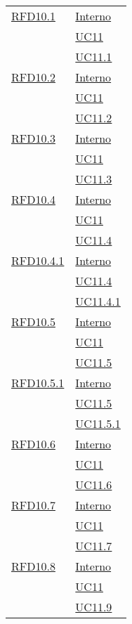 \begin{longtable}{|>{\centering}m{5cm}|m{5cm}<{\centering}|}
\hyperlink{RFD10.1}{RFD10.1} & \hyperlink{Interno}{Interno}\\
& \hyperref[UC11]{UC11}\\
& \hyperref[UC11.1]{UC11.1}\\ \hline

\hyperlink{RFD10.2}{RFD10.2} & \hyperlink{Interno}{Interno}\\
& \hyperref[UC11]{UC11}\\
& \hyperref[UC11.2]{UC11.2}\\ \hline

\hyperlink{RFD10.3}{RFD10.3} & \hyperlink{Interno}{Interno}\\
& \hyperref[UC11]{UC11}\\
& \hyperref[UC11.3]{UC11.3}\\ \hline

\hyperlink{RFD10.4}{RFD10.4} & \hyperlink{Interno}{Interno}\\
& \hyperref[UC11]{UC11}\\
& \hyperref[UC11.4]{UC11.4}\\ \hline

\hyperlink{RFD10.4.1}{RFD10.4.1} & \hyperlink{Interno}{Interno}\\
& \hyperref[UC11.4]{UC11.4}\\
& \hyperref[UC11.4.1]{UC11.4.1}\\ \hline

\hyperlink{RFD10.5}{RFD10.5} & \hyperlink{Interno}{Interno}\\
& \hyperref[UC11]{UC11}\\
& \hyperref[UC11.5]{UC11.5}\\ \hline

\hyperlink{RFD10.5.1}{RFD10.5.1} & \hyperlink{Interno}{Interno}\\
& \hyperref[UC11.5]{UC11.5}\\
& \hyperref[UC11.5.1]{UC11.5.1}\\ \hline

\hyperlink{RFD10.6}{RFD10.6} & \hyperlink{Interno}{Interno}\\
& \hyperref[UC11]{UC11}\\
& \hyperref[UC11.6]{UC11.6}\\ \hline

\hyperlink{RFD10.7}{RFD10.7} & \hyperlink{Interno}{Interno}\\
& \hyperref[UC11]{UC11}\\
& \hyperref[UC11.7]{UC11.7}\\ \hline

\hyperlink{RFD10.8}{RFD10.8} & \hyperlink{Interno}{Interno}\\
& \hyperref[UC11]{UC11}\\
& \hyperref[UC11.9]{UC11.9}\\ \hline


\end{longtable}
